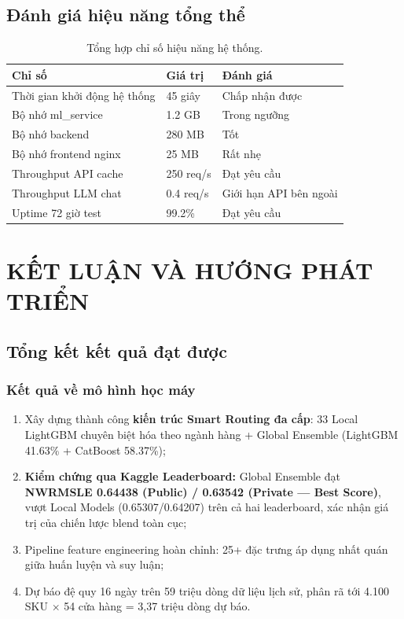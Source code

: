 \documentclass[12pt,a4paper]{report}
\begin{document}
\section{Đánh giá hiệu năng tổng thể}

\begin{table}[H]
\centering
\begin{tabular}{@{}lll@{}}
\toprule
\textbf{Chỉ số} & \textbf{Giá trị} & \textbf{Đánh giá} \\
\midrule
Thời gian khởi động hệ thống & 45 giây & Chấp nhận được \\
Bộ nhớ ml\_service & 1.2 GB & Trong ngưỡng \\
Bộ nhớ backend & 280 MB & Tốt \\
Bộ nhớ frontend nginx & 25 MB & Rất nhẹ \\
Throughput API cache & 250 req/s & Đạt yêu cầu \\
Throughput LLM chat & 0.4 req/s & Giới hạn API bên ngoài \\
Uptime 72 giờ test & 99.2\% & Đạt yêu cầu \\
\bottomrule
\end{tabular}
\caption{Tổng hợp chỉ số hiệu năng hệ thống.}
\end{table}

\chapter{KẾT LUẬN VÀ HƯỚNG PHÁT TRIỂN}

\section{Tổng kết kết quả đạt được}

\subsection{Kết quả về mô hình học máy}

\begin{enumerate}
    \item Xây dựng thành công \textbf{kiến trúc Smart Routing đa cấp}: 33 Local LightGBM chuyên biệt hóa theo ngành hàng + Global Ensemble (LightGBM 41.63\% + CatBoost 58.37\%);
    
    \item \textbf{Kiểm chứng qua Kaggle Leaderboard:} Global Ensemble đạt \textbf{NWRMSLE 0.64438 (Public) / 0.63542 (Private --- Best Score)}, vượt Local Models (0.65307/0.64207) trên cả hai leaderboard, xác nhận giá trị của chiến lược blend toàn cục;
    
    \item Pipeline feature engineering hoàn chỉnh: 25+ đặc trưng áp dụng nhất quán giữa huấn luyện và suy luận;
    
    \item Dự báo đệ quy 16 ngày trên 59 triệu dòng dữ liệu lịch sử, phân rã tới 4.100 SKU $\times$ 54 cửa hàng = 3,37 triệu dòng dự báo.
\end{enumerate}
\end{document}
